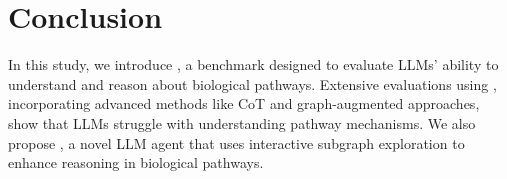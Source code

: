 \section{Conclusion}
In this study, we introduce \benchname, a benchmark designed to evaluate LLMs' ability to understand and reason about biological pathways. Extensive evaluations using \benchname, incorporating advanced methods like CoT and graph-augmented approaches, show that LLMs struggle with understanding pathway mechanisms. We also propose \modelname, a novel LLM agent that uses interactive subgraph exploration to enhance reasoning in biological pathways.